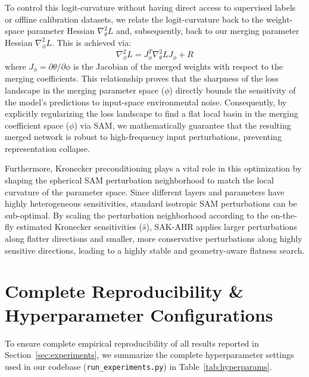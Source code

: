 \documentclass{article}
\theoremstyle{plain}
\theoremstyle{definition}
\theoremstyle{remark}
\begin{document}
To control this logit-curvature without having direct access to supervised labels or offline calibration datasets, we relate the logit-curvature back to the weight-space parameter Hessian $\nabla^2_\theta L$ and, subsequently, back to our merging parameter Hessian $\nabla^2_\phi L$. This is achieved via:
\begin{equation}
\nabla^2_\phi L = J^T_\phi \nabla^2_\theta L J_\phi + R
\end{equation}
where $J_\phi = \partial \theta / \partial \phi$ is the Jacobian of the merged weights with respect to the merging coefficients. This relationship proves that the sharpness of the loss landscape in the merging parameter space ($\phi$) directly bounds the sensitivity of the model's predictions to input-space environmental noise. Consequently, by explicitly regularizing the loss landscape to find a flat local basin in the merging coefficient space ($\phi$) via SAM, we mathematically guarantee that the resulting merged network is robust to high-frequency input perturbations, preventing representation collapse.

Furthermore, Kronecker preconditioning plays a vital role in this optimization by shaping the spherical SAM perturbation neighborhood to match the local curvature of the parameter space. Since different layers and parameters have highly heterogeneous sensitivities, standard isotropic SAM perturbations can be sub-optimal. By scaling the perturbation neighborhood according to the on-the-fly estimated Kronecker sensitivities ($\hat{s}$), SAK-AHR applies larger perturbations along flatter directions and smaller, more conservative perturbations along highly sensitive directions, leading to a highly stable and geometry-aware flatness search.

\section{Complete Reproducibility \& Hyperparameter Configurations}
\label{appendix:hyperparameters}

To ensure complete empirical reproducibility of all results reported in Section~\ref{sec:experiments}, we summarize the complete hyperparameter settings used in our codebase (\texttt{run\_experiments.py}) in Table~\ref{tab:hyperparams}.
\end{document}
